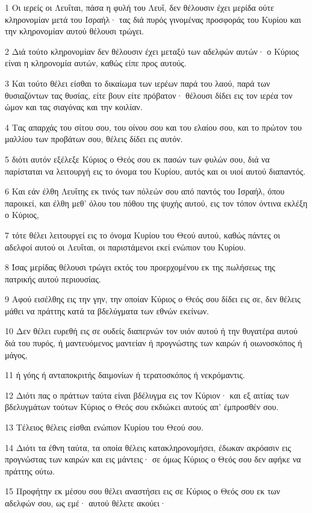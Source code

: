 \par 1 Οι ιερείς οι Λευΐται, πάσα η φυλή του Λευΐ, δεν θέλουσιν έχει μερίδα ούτε κληρονομίαν μετά του Ισραήλ· τας διά πυρός γινομένας προσφοράς του Κυρίου και την κληρονομίαν αυτού θέλουσι τρώγει.
\par 2 Διά τούτο κληρονομίαν δεν θέλουσιν έχει μεταξύ των αδελφών αυτών· ο Κύριος είναι η κληρονομία αυτών, καθώς είπε προς αυτούς.
\par 3 Και τούτο θέλει είσθαι το δικαίωμα των ιερέων παρά του λαού, παρά των θυσιαζόντων τας θυσίας, είτε βουν είτε πρόβατον· θέλουσι δίδει εις τον ιερέα τον ώμον και τας σιαγόνας και την κοιλίαν.
\par 4 Τας απαρχάς του σίτου σου, του οίνου σου και του ελαίου σου, και το πρώτον του μαλλίου των προβάτων σου, θέλεις δίδει εις αυτόν.
\par 5 διότι αυτόν εξέλεξε Κύριος ο Θεός σου εκ πασών των φυλών σου, διά να παρίσταται να λειτουργή εις το όνομα του Κυρίου, αυτός και οι υιοί αυτού διαπαντός.
\par 6 Και εάν έλθη Λευΐτης εκ τινός των πόλεών σου από παντός του Ισραήλ, όπου παροικεί, και έλθη μεθ' όλου του πόθου της ψυχής αυτού, εις τον τόπον όντινα εκλέξη ο Κύριος,
\par 7 τότε θέλει λειτουργεί εις το όνομα Κυρίου του Θεού αυτού, καθώς πάντες οι αδελφοί αυτού οι Λευΐται, οι παριστάμενοι εκεί ενώπιον του Κυρίου.
\par 8 Ίσας μερίδας θέλουσι τρώγει εκτός του προερχομένου εκ της πωλήσεως της πατρικής αυτού περιουσίας.
\par 9 Αφού εισέλθης εις την γην, την οποίαν Κύριος ο Θεός σου δίδει εις σε, δεν θέλεις μάθει να πράττης κατά τα βδελύγματα των εθνών εκείνων.
\par 10 Δεν θέλει ευρεθή εις σε ουδείς διαπερνών τον υιόν αυτού ή την θυγατέρα αυτού διά του πυρός, ή μαντευόμενος μαντείαν ή προγνώστης των καιρών ή οιωνοσκόπος ή μάγος,
\par 11 ή γόης ή ανταποκριτής δαιμονίων ή τερατοσκόπος ή νεκρόμαντις.
\par 12 Διότι πας ο πράττων ταύτα είναι βδέλυγμα εις τον Κύριον· και εξ αιτίας των βδελυγμάτων τούτων Κύριος ο Θεός σου εκδιώκει αυτούς απ' έμπροσθέν σου.
\par 13 Τέλειος θέλεις είσθαι ενώπιον Κυρίου του Θεού σου.
\par 14 Διότι τα έθνη ταύτα, τα οποία θέλεις κατακληρονομήσει, έδωκαν ακρόασιν εις προγνώστας των καιρών και εις μάντεις· σε όμως Κύριος ο Θεός σου δεν αφήκε να πράττης ούτω.
\par 15 Προφήτην εκ μέσου σου θέλει αναστήσει εις σε Κύριος ο Θεός σου εκ των αδελφών σου, ως εμέ· αυτού θέλετε ακούει·
